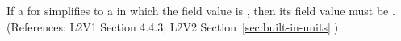 If a \UnitDefinition for  simplifies to a \Unit in which the
 field value is , then its  field
value must be . (References: L2V1 Section 4.4.3; L2V2
Section~\ref{sec:built-in-units}.)
